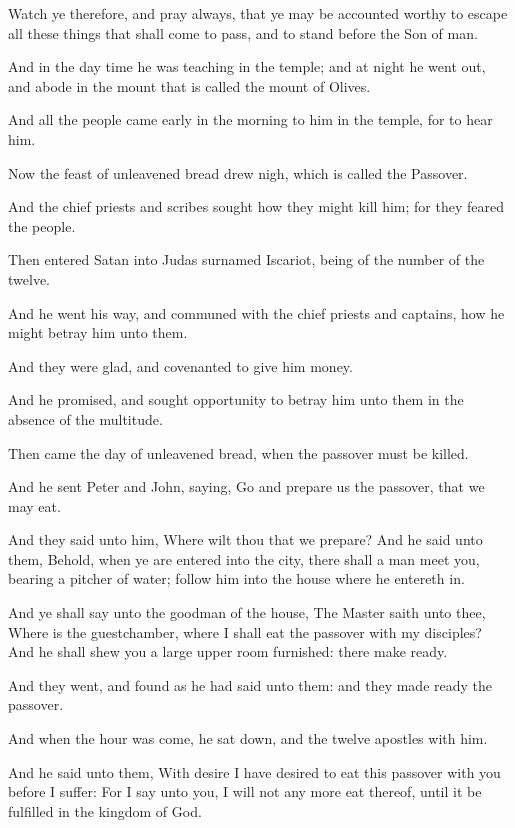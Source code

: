 \Verse Watch ye therefore, and pray always, that ye may be accounted worthy to escape all these things that shall come to pass, and to stand before the Son of man.

\Verse And in the day time he was teaching in the temple; and at night he went out, and abode in the mount that is called the mount of Olives.

\Verse And all the people came early in the morning to him in the temple, for to hear him.


\Chapter
\Verse Now the feast of unleavened bread drew nigh, which is called the Passover.

\Verse And the chief priests and scribes sought how they might kill him; for they feared the people.

\Verse Then entered Satan into Judas surnamed Iscariot, being of the number of the twelve.

\Verse And he went his way, and communed with the chief priests and captains, how he might betray him unto them.

\Verse And they were glad, and covenanted to give him money.

\Verse And he promised, and sought opportunity to betray him unto them in the absence of the multitude.

\Verse Then came the day of unleavened bread, when the passover must be killed.

\Verse And he sent Peter and John, saying, Go and prepare us the passover, that we may eat.

\Verse And they said unto him, Where wilt thou that we prepare?  \Verse And he said unto them, Behold, when ye are entered into the city, there shall a man meet you, bearing a pitcher of water; follow him into the house where he entereth in.

\Verse And ye shall say unto the goodman of the house, The Master saith unto thee, Where is the guestchamber, where I shall eat the passover with my disciples?  \Verse And he shall shew you a large upper room furnished: there make ready.

\Verse And they went, and found as he had said unto them: and they made ready the passover.

\Verse And when the hour was come, he sat down, and the twelve apostles with him.

\Verse And he said unto them, With desire I have desired to eat this passover with you before I suffer: \Verse For I say unto you, I will not any more eat thereof, until it be fulfilled in the kingdom of God.

